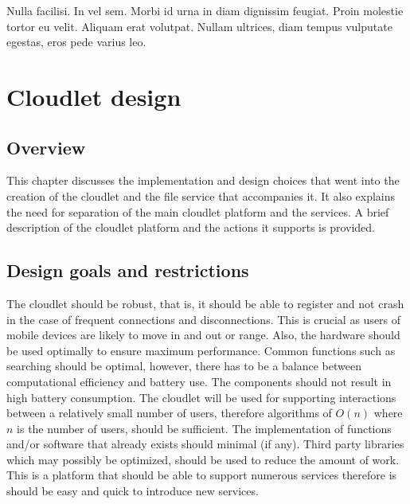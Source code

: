\begin{savequote}[75mm] 
Nulla facilisi. In vel sem. Morbi id urna in diam dignissim feugiat. Proin molestie tortor eu velit. Aliquam erat volutpat. Nullam ultrices, diam tempus vulputate egestas, eros pede varius leo.
\end{savequote}

\chapter{Cloudlet design}
\label{chapterfour}

\section{Overview}

This chapter discusses the implementation and design choices that went into the creation of the cloudlet and the file service that accompanies it. It also explains the need for separation of the main cloudlet platform
and the services. A brief description of the cloudlet platform and the actions it supports is provided.

\section{Design goals and restrictions}
The cloudlet should be robust, that is, it should be able to register and not crash in the case of frequent connections and disconnections. This is crucial as users of mobile devices are likely to move in and out or
range. Also, the hardware should be used optimally to ensure maximum performance. Common functions such as searching should be optimal, however, there has to be a balance between computational efficiency and battery
use. The components should not result in high battery consumption. The cloudlet will be used for supporting interactions between a relatively small number of users, therefore algorithms of $O(n)$ where $n$ is the number
of users, should be sufficient. The implementation of functions and/or software that already exists should minimal (if any). Third party libraries which may possibly be optimized, should be used to reduce the amount
of work. This is a platform that should be able to support numerous services therefore is should be easy and quick to introduce new services.\newline


